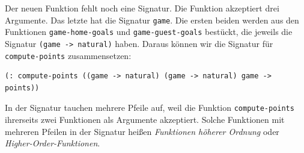 Der neuen Funktion fehlt noch eine Signatur.  Die Funktion akzeptiert
drei Argumente.  Das letzte hat die Signatur \lstinline{game}.  Die
ersten beiden werden aus den Funktionen \lstinline{game-home-goals}
und \lstinline{game-guest-goals} bestückt, die jeweils die Signatur
\lstinline{(game -> natural)} haben.  Daraus können wir die Signatur
für \lstinline{compute-points} zusammensetzen:
%
\begin{lstlisting}
(: compute-points ((game -> natural) (game -> natural) game -> points))
\end{lstlisting}
%
In der Signatur tauchen mehrere Pfeile auf, weil die Funktion
\lstinline{compute-points} ihrerseits zwei Funktionen als Argumente
akzeptiert.  Solche Funktionen mit mehreren Pfeilen in der Signatur
heißen \textit{Funktionen höherer Ordnung} oder
\textit{Higher-Order-Funktionen}.


